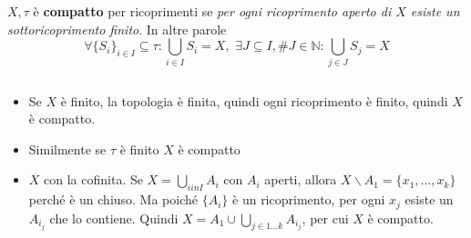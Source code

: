 \begin{definition}
    \(X, \tau\) è \textbf{compatto} per ricoprimenti se \emph{per ogni
    ricoprimento aperto di \(X\) esiste un sottoricoprimento finito}. In altre
    parole
    \[
        \forall \{S_i\}_{i \in I} \subseteq \tau : \bigcup_{i \in  I} S_{i} =
        X,\,\,\exists J \subseteq I, \#J \in \mathbb{N}: \bigcup_{j \in J} S_j =
        X
    \]
\end{definition}
\begin{example} \(\) 
\begin{itemize}[label = --]
    \item Se \(X\) è finito, la topologia è finita, quindi ogni ricoprimento è
        finito, quindi \(X\) è compatto.
    \item Similmente se \(\tau\) è finito \(X\) è compatto
    \item \(X\) con la cofinita. Se \(X = \bigcup_{i in I} A_{i}\) con \(A_{i}\)
        aperti, allora \(X \smallsetminus A_{1} = \{x_{1}, \dots, x_k\} \)
        perché è un chiuso. Ma poiché \(\{A_{i}\} \) è un ricoprimento, per ogni
        \(x_{j}\) esiste un \(A_{i_j}\) che lo contiene. Quindi \(X = A_{1} \cup
        \bigcup_{j \in 1\dots k} A_{i_j}\), per cui \(X\) è compatto.
\end{itemize}
\end{example}
